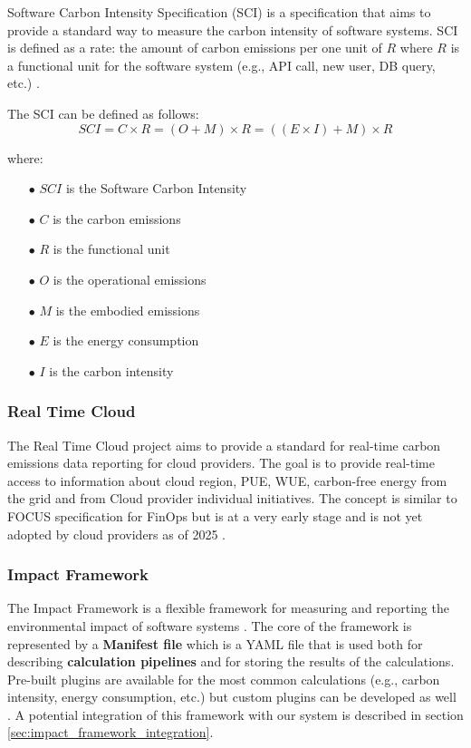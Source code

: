 Software Carbon Intensity Specification (SCI) is a specification that aims to provide a standard way to measure the carbon intensity of software systems.
SCI is defined as a rate: the amount of carbon emissions per one unit of $R$ where $R$ is a functional unit for the software system (e.g., API call, new user, DB query, etc.) \cite{sci}.

The SCI can be defined as follows:
\[
SCI = C \times R = (O + M) \times R = ((E \times I) + M) \times R
\]

where:
\begin{itemize}[itemsep=0.2pt, topsep=1pt]
    \item[$\bullet$] $SCI$ is the Software Carbon Intensity
    \item[$\bullet$] $C$ is the carbon emissions
    \item[$\bullet$] $R$ is the functional unit
    \item[$\bullet$] $O$ is the operational emissions
    \item[$\bullet$] $M$ is the embodied emissions
    \item[$\bullet$] $E$ is the energy consumption
    \item[$\bullet$] $I$ is the carbon intensity
\end{itemize}

\subsubsection{Real Time Cloud}
\label{sec:real_time_cloud}

The Real Time Cloud project aims to provide a standard for real-time carbon emissions data reporting for cloud providers.
The goal is to provide real-time access to information about cloud region, PUE, WUE, carbon-free energy from the grid and from Cloud provider individual initiatives.
The concept is similar to FOCUS specification for FinOps but is at a very early stage and is not yet adopted by cloud providers as of 2025 \cite{real_time_cloud}.


\subsubsection{Impact Framework}

The Impact Framework is a flexible framework for measuring and reporting the environmental impact of software systems \cite{impact_framework}.
The core of the framework is represented by a \textbf{Manifest file} which is a YAML file that is used both for describing \textbf{calculation pipelines} and for storing the results of the calculations.
Pre-built plugins are available for the most common calculations (e.g., carbon intensity, energy consumption, etc.) but custom plugins can be developed as well \cite{impact_framework}.
A potential integration of this framework with our system is described in section \ref{sec:impact_framework_integration}.

